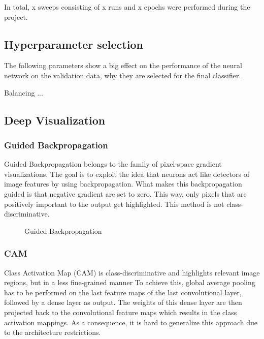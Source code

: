 \documentclass{article}
\begin{document}
In total, x sweeps consisting of x runs and x epochs were performed during the project.

\subsection{Hyperparameter selection}
The following parameters show a big effect on the performance of the neural network on the validation data, 
why they are selected for the final classifier.

Balancing
...
\subsection{Deep Visualization}
\subsubsection{Guided Backpropagation}
Guided Backpropagation belongs to the family of pixel-space gradient visualizations. 
The goal is to exploit the idea that neurons act like detectors of image features by using backpropagation.
What makes this backpropagation guided is that negative gradient are set to zero. This way, only pixels that are positively important to 
the output get highlighted. This method is not class-discriminative.  
\begin{figure}[h]
  \centering
  \hspace{0.5cm}
  \caption{Guided Backpropagation}
\end{figure}
\subsubsection{CAM}
Class Activation Map (CAM) is class-discriminative and highlights relevant image regions, but in a less fine-grained manner
To achieve this, global average pooling has to be performed on the last feature maps of the last convolutional layer, followed by a dense layer as output.
The weights of this dense layer are then projected back to the convolutional feature maps which results in the class activation mappings.
As a consequence, it is hard to generalize this approach due to the architecture restrictions.
\end{document}
